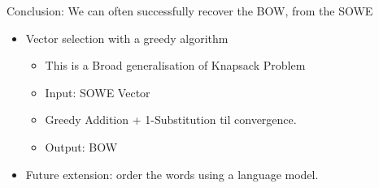\documentclass[]{beamer}
\begin{document}
\begin{frame}{Conclusion: We can often successfully recover the BOW, from the SOWE}
	\begin{itemize}
		\item Vector selection with a greedy algorithm
		\begin{itemize}
			\item This is a Broad generalisation of Knapsack Problem
			\item Input: SOWE Vector
			\item Greedy Addition + 1-Substitution til convergence.
			\item Output: BOW
		\end{itemize}
		\vfill
		\item Future extension: order the words using a language model. 
	\end{itemize}
\end{frame}
\end{document}
